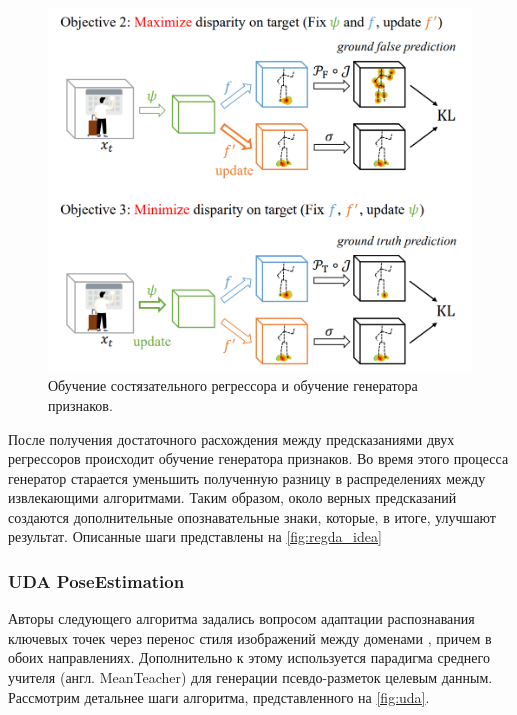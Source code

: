 \begin{figure}[h]
	\centering
	\includegraphics[width=.8\textwidth]{./images/regda_idea}
	\caption{Обучение состязательного регрессора и обучение генератора признаков.\cite{regda}}
	\label{fig:regda_idea}
\end{figure}

После получения достаточного расхождения между предсказаниями двух регрессоров происходит обучение генератора признаков. Во время этого процесса генератор старается уменьшить полученную разницу в распределениях между извлекающими алгоритмами. Таким образом, около верных предсказаний создаются дополнительные опознавательные знаки, которые, в итоге, улучшают результат. Описанные шаги представлены на \autoref{fig:regda_idea}


\subsubsection*{UDA PoseEstimation}

Авторы следующего алгоритма задались вопросом адаптации распознавания ключевых точек через перенос стиля изображений между доменами \cite{uda}, причем в обоих направлениях. Дополнительно к этому используется парадигма среднего учителя (англ. MeanTeacher) для генерации псевдо-разметок целевым данным. Рассмотрим детальнее шаги алгоритма, представленного на \autoref{fig:uda}.

